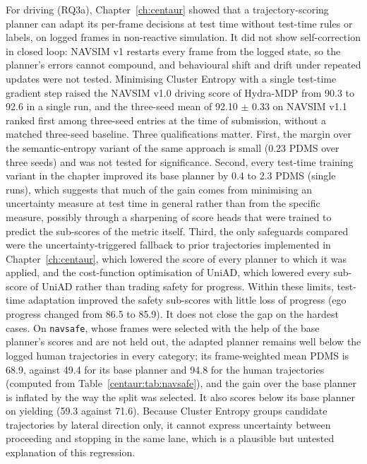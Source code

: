 For driving (RQ3a), Chapter~\ref{ch:centaur} showed that a trajectory-scoring planner can adapt its per-frame decisions at test time without test-time rules or labels, on logged frames in non-reactive simulation. It did not show self-correction in closed loop: NAVSIM v1 restarts every frame from the logged state, so the planner's errors cannot compound, and behavioural shift and drift under repeated updates were not tested. Minimising Cluster Entropy with a single test-time gradient step raised the NAVSIM v1.0 driving score of Hydra-MDP from 90.3 to 92.6 in a single run, and the three-seed mean of 92.10 $\pm$ 0.33 on NAVSIM v1.1 ranked first among three-seed entries at the time of submission, without a matched three-seed baseline. Three qualifications matter. First, the margin over the semantic-entropy variant of the same approach is small (0.23 PDMS over three seeds) and was not tested for significance. Second, every test-time training variant in the chapter improved its base planner by 0.4 to 2.3 PDMS (single runs), which suggests that much of the gain comes from minimising an uncertainty measure at test time in general rather than from the specific measure, possibly through a sharpening of score heads that were trained to predict the sub-scores of the metric itself. Third, the only safeguards compared were the uncertainty-triggered fallback to prior trajectories implemented in Chapter~\ref{ch:centaur}, which lowered the score of every planner to which it was applied, and the cost-function optimisation of UniAD, which lowered every sub-score of UniAD rather than trading safety for progress. Within these limits, test-time adaptation improved the safety sub-scores with little loss of progress (ego progress changed from 86.5 to 85.9). It does not close the gap on the hardest cases. On \texttt{navsafe}, whose frames were selected with the help of the base planner's scores and are not held out, the adapted planner remains well below the logged human trajectories in every category; its frame-weighted mean PDMS is 68.9, against 49.4 for its base planner and 94.8 for the human trajectories (computed from Table~\ref{centaur:tab:navsafe}), and the gain over the base planner is inflated by the way the split was selected. It also scores below its base planner on yielding (59.3 against 71.6). Because Cluster Entropy groups candidate trajectories by lateral direction only, it cannot express uncertainty between proceeding and stopping in the same lane, which is a plausible but untested explanation of this regression.

